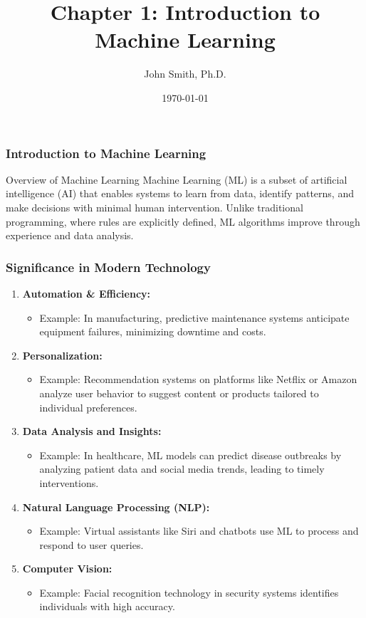 \documentclass[aspectratio=169]{beamer}
\title[Introduction to Machine Learning]{Chapter 1: Introduction to Machine Learning}
\author[J. Smith]{John Smith, Ph.D.}
\institute[University Name]{
  Department of Computer Science\\
  University Name\\
  \vspace{0.3cm}
  Email: email@university.edu\\
  Website: www.university.edu
}
\date{\today}
\begin{document}
\frame{\titlepage}

\begin{frame}[fragile]
    \frametitle{Introduction to Machine Learning}
    \begin{block}{Overview of Machine Learning}
        Machine Learning (ML) is a subset of artificial intelligence (AI) that enables systems to learn from data, identify patterns, and make decisions with minimal human intervention. Unlike traditional programming, where rules are explicitly defined, ML algorithms improve through experience and data analysis.
    \end{block}
\end{frame}

\begin{frame}[fragile]
    \frametitle{Significance in Modern Technology}
    \begin{enumerate}
        \item \textbf{Automation \& Efficiency:}
            \begin{itemize}
                \item Example: In manufacturing, predictive maintenance systems anticipate equipment failures, minimizing downtime and costs.
            \end{itemize}
        \item \textbf{Personalization:}
            \begin{itemize}
                \item Example: Recommendation systems on platforms like Netflix or Amazon analyze user behavior to suggest content or products tailored to individual preferences.
            \end{itemize}
        \item \textbf{Data Analysis and Insights:}
            \begin{itemize}
                \item Example: In healthcare, ML models can predict disease outbreaks by analyzing patient data and social media trends, leading to timely interventions.
            \end{itemize}
        \item \textbf{Natural Language Processing (NLP):}
            \begin{itemize}
                \item Example: Virtual assistants like Siri and chatbots use ML to process and respond to user queries.
            \end{itemize}
        \item \textbf{Computer Vision:}
            \begin{itemize}
                \item Example: Facial recognition technology in security systems identifies individuals with high accuracy.
            \end{itemize}
    \end{enumerate}
\end{frame}
\end{document}
